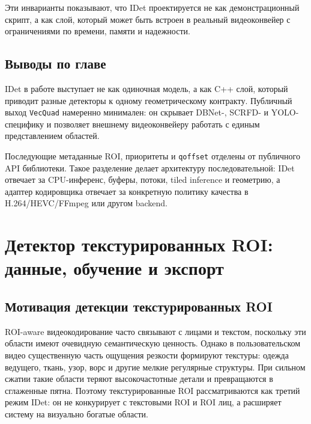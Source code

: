 \documentclass[12pt,a4paper,oneside,openany]{report}
\begin{document}
Эти инварианты показывают, что IDet проектируется не как демонстрационный скрипт, а как слой,
который может быть встроен в реальный видеоконвейер с ограничениями по времени, памяти и
надежности.


\section{Выводы по главе}

IDet в работе выступает не как одиночная модель, а как C++ слой, который приводит разные
детекторы к одному геометрическому контракту. Публичный выход \texttt{VecQuad} намеренно
минимален: он скрывает DBNet-, SCRFD- и YOLO-специфику и позволяет внешнему видеоконвейеру
работать с единым представлением областей.

Последующие метаданные ROI, приоритеты и \texttt{qoffset} отделены от публичного API
библиотеки. Такое разделение делает архитектуру последовательной: IDet отвечает за CPU-инференс,
буферы, потоки, tiled inference и геометрию, а адаптер кодировщика отвечает за конкретную
политику качества в H.264/HEVC/FFmpeg или другом backend.


\chapter{Детектор текстурированных ROI: данные, обучение и экспорт}


\section{Мотивация детекции текстурированных ROI}

ROI-aware видеокодирование часто связывают с лицами и текстом, поскольку эти области имеют
очевидную семантическую ценность. Однако в пользовательском видео существенную часть ощущения
резкости формируют текстуры: одежда ведущего, ткань, узор, ворс и другие мелкие регулярные
структуры. При сильном сжатии такие области теряют высокочастотные детали и превращаются в
сглаженные пятна. Поэтому текстурированные ROI рассматриваются как третий режим IDet: он не
конкурирует с текстовыми ROI и ROI лиц, а расширяет систему на визуально богатые области.
\end{document}
